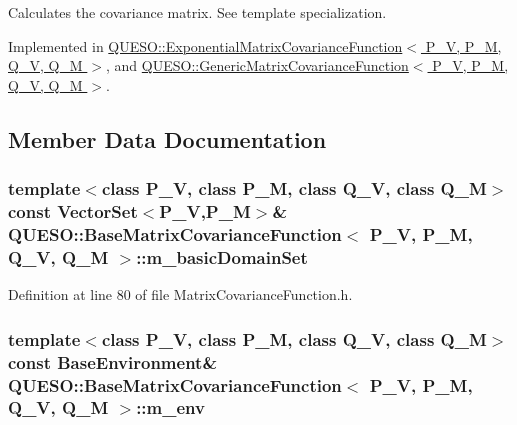 Calculates the covariance matrix. See template specialization. 



Implemented in \hyperlink{class_q_u_e_s_o_1_1_exponential_matrix_covariance_function_a039c72a29ea453320cbdb2a6e54a360a}{Q\-U\-E\-S\-O\-::\-Exponential\-Matrix\-Covariance\-Function$<$ P\-\_\-\-V, P\-\_\-\-M, Q\-\_\-\-V, Q\-\_\-\-M $>$}, and \hyperlink{class_q_u_e_s_o_1_1_generic_matrix_covariance_function_ad1dc99df94d6fb77aa658fda06fd832d}{Q\-U\-E\-S\-O\-::\-Generic\-Matrix\-Covariance\-Function$<$ P\-\_\-\-V, P\-\_\-\-M, Q\-\_\-\-V, Q\-\_\-\-M $>$}.



\subsection{Member Data Documentation}
\hypertarget{class_q_u_e_s_o_1_1_base_matrix_covariance_function_a3c466742b27fc304cce106f96d8e49c7}{
\subsubsection[{m\-\_\-basic\-Domain\-Set}]{\setlength{\rightskip}{0pt plus 5cm}template$<$class P\-\_\-\-V, class P\-\_\-\-M, class Q\-\_\-\-V, class Q\-\_\-\-M$>$ const {\bf Vector\-Set}$<$P\-\_\-\-V,P\-\_\-\-M$>$\& {\bf Q\-U\-E\-S\-O\-::\-Base\-Matrix\-Covariance\-Function}$<$ P\-\_\-\-V, P\-\_\-\-M, Q\-\_\-\-V, Q\-\_\-\-M $>$\-::m\-\_\-basic\-Domain\-Set\hspace{0.3cm}{\ttfamily [protected]}}}\label{class_q_u_e_s_o_1_1_base_matrix_covariance_function_a3c466742b27fc304cce106f96d8e49c7}


Definition at line 80 of file Matrix\-Covariance\-Function.\-h.

\hypertarget{class_q_u_e_s_o_1_1_base_matrix_covariance_function_a2bf98f6576db775109e240a2d828c578}{
\subsubsection[{m\-\_\-env}]{\setlength{\rightskip}{0pt plus 5cm}template$<$class P\-\_\-\-V, class P\-\_\-\-M, class Q\-\_\-\-V, class Q\-\_\-\-M$>$ const {\bf Base\-Environment}\& {\bf Q\-U\-E\-S\-O\-::\-Base\-Matrix\-Covariance\-Function}$<$ P\-\_\-\-V, P\-\_\-\-M, Q\-\_\-\-V, Q\-\_\-\-M $>$\-::m\-\_\-env\hspace{0.3cm}{\ttfamily [protected]}}}\label{class_q_u_e_s_o_1_1_base_matrix_covariance_function_a2bf98f6576db775109e240a2d828c578}


